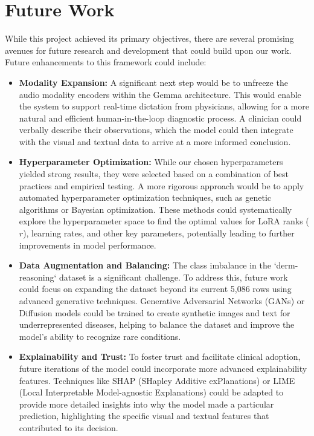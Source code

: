 \documentclass[11pt]{article}
\begin{document}
\section{Future Work}
While this project achieved its primary objectives, there are several promising avenues for future research and development that could build upon our work. Future enhancements to this framework could include:
\begin{itemize}
    \item \textbf{Modality Expansion:} A significant next step would be to unfreeze the audio modality encoders within the Gemma architecture. This would enable the system to support real-time dictation from physicians, allowing for a more natural and efficient human-in-the-loop diagnostic process. A clinician could verbally describe their observations, which the model could then integrate with the visual and textual data to arrive at a more informed conclusion.
    \item \textbf{Hyperparameter Optimization:} While our chosen hyperparameters yielded strong results, they were selected based on a combination of best practices and empirical testing. A more rigorous approach would be to apply automated hyperparameter optimization techniques, such as genetic algorithms or Bayesian optimization. These methods could systematically explore the hyperparameter space to find the optimal values for LoRA ranks ($r$), learning rates, and other key parameters, potentially leading to further improvements in model performance.
    \item \textbf{Data Augmentation and Balancing:} The class imbalance in the `derm-reasoning` dataset is a significant challenge. To address this, future work could focus on expanding the dataset beyond its current 5,086 rows using advanced generative techniques. Generative Adversarial Networks (GANs) or Diffusion models could be trained to create synthetic images and text for underrepresented diseases, helping to balance the dataset and improve the model's ability to recognize rare conditions.
    \item \textbf{Explainability and Trust:} To foster trust and facilitate clinical adoption, future iterations of the model could incorporate more advanced explainability features. Techniques like SHAP (SHapley Additive exPlanations) or LIME (Local Interpretable Model-agnostic Explanations) could be adapted to provide more detailed insights into why the model made a particular prediction, highlighting the specific visual and textual features that contributed to its decision.
\end{itemize}


\renewcommand{\bibname}{References}

\end{document}
